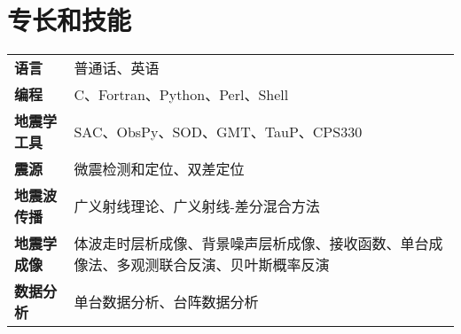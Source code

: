 \section*{专长和技能}

\begin{tabular}{p{} p{}}
\textbf{语言} & 普通话、英语 \\
\textbf{编程} & C、Fortran、Python、Perl、Shell \\
\textbf{地震学工具} & SAC、ObsPy、SOD、GMT、TauP、CPS330 \\
\textbf{震源} & 微震检测和定位、双差定位 \\
\textbf{地震波传播} & 广义射线理论、广义射线-差分混合方法 \\
\textbf{地震学成像} & 体波走时层析成像、背景噪声层析成像、接收函数、单台成像法、多观测联合反演、贝叶斯概率反演 \\
\textbf{数据分析} & 单台数据分析、台阵数据分析 \\
\end{tabular}
